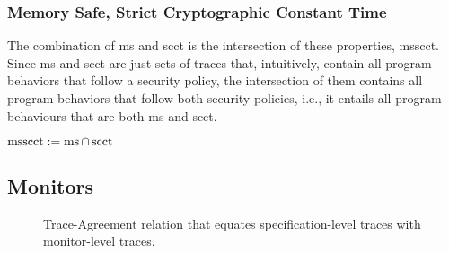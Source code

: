 \documentclass[utf8,acmsmall,review,screen,dvipsnames,anonymous]{acmart}
\begin{document}
\subsubsection{Memory Safe, Strict Cryptographic Constant Time}

The combination of \gls{ms} and \gls{scct} is the intersection of these properties, \gls{msscct}.
Since \gls{ms} and \gls{scct} are just sets of traces that, intuitively, contain all program behaviors that follow a security policy, the intersection of them contains all program behaviors that follow both security policies, i.e., it entails all program behaviours that are both \gls{ms} and \gls{scct}.

\begin{definition}\label{def:trace:msscctdef}
  $
  \operatorname{msscct}:=\operatorname{ms}\cap\operatorname{scct}
  $
\end{definition}

\subsection{Monitors}\label{subsec:monitors}

\begin{figure}[h!]
  \caption{Trace-Agreement relation that equates specification-level traces with monitor-level traces.}\label{fig:stuttereq}
\end{figure}
\end{document}
